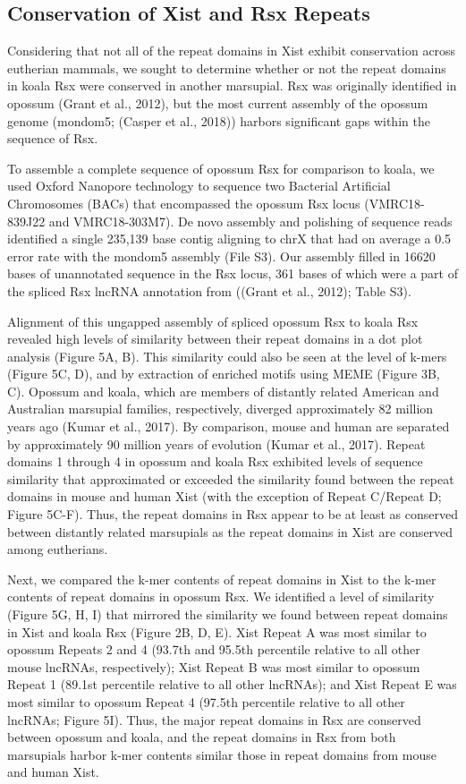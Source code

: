 \subsection{Conservation of Xist and Rsx Repeats}
Considering that not all of the repeat domains in Xist exhibit conservation across eutherian mammals, we sought to determine whether or not the repeat domains in koala Rsx were conserved in another marsupial. Rsx was originally identified in opossum (Grant et al., 2012), but the most current assembly of the opossum genome (mondom5; (Casper et al., 2018)) harbors significant gaps within the sequence of Rsx. 

To assemble a complete sequence of opossum Rsx for comparison to koala, we used Oxford Nanopore technology to sequence two Bacterial Artificial Chromosomes (BACs) that encompassed the opossum Rsx locus (VMRC18-839J22 and VMRC18-303M7). De novo assembly and polishing of sequence reads identified a single 235,139 base contig aligning to chrX that had on average a 0.5 error rate with the mondom5 assembly (File S3). Our assembly filled in 16620 bases of unannotated sequence in the Rsx locus, 361 bases of which were a part of the spliced Rsx lncRNA annotation from ((Grant et al., 2012); Table S3).

Alignment of this ungapped assembly of spliced opossum Rsx to koala Rsx revealed high levels of similarity between their repeat domains in a dot plot analysis (Figure 5A, B). This similarity could also be seen at the level of k-mers (Figure 5C, D), and by extraction of enriched motifs using MEME (Figure 3B, C). Opossum and koala, which are members of distantly related American and Australian marsupial families, respectively, diverged approximately 82 million years ago (Kumar et al., 2017). By comparison, mouse and human are separated by approximately 90 million years of evolution (Kumar et al., 2017). Repeat domains 1 through 4 in opossum and koala Rsx exhibited levels of sequence similarity that approximated or exceeded the similarity found between the repeat domains in mouse and human Xist (with the exception of Repeat C/Repeat D; Figure 5C-F). Thus, the repeat domains in Rsx appear to be at least as conserved between distantly related marsupials as the repeat domains in Xist are conserved among eutherians.

Next, we compared the k-mer contents of repeat domains in Xist to the k-mer contents of repeat domains in opossum Rsx. We identified a level of similarity (Figure 5G, H, I) that mirrored the similarity we found between repeat domains in Xist and koala Rsx (Figure 2B, D, E). Xist Repeat A was most similar to opossum Repeats 2 and 4 (93.7th and 95.5th percentile relative to all other mouse lncRNAs, respectively); Xist Repeat B was most similar to opossum Repeat 1 (89.1st percentile relative to all other lncRNAs); and Xist Repeat E was most similar to opossum Repeat 4 (97.5th percentile relative to all other lncRNAs; Figure 5I). Thus, the major repeat domains in Rsx are conserved between opossum and koala, and the repeat domains in Rsx from both marsupials harbor k-mer contents similar those in repeat domains from mouse and human Xist.

